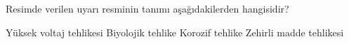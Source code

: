 \begin{question}[subtitle=]
  	\begin{figure}[!htb]
		\centering
		\fbox{\texttt{[image: ww23]}}
	\end{figure}

  Resimde verilen uyarı resminin tanımı aşağıdakilerden hangisidir?
	\begin{tasks}
          \task Yüksek voltaj tehlikesi \correct
          \task Biyolojik tehlike
          \task Korozif tehlike 
          \task Zehirli madde tehlikesi
	\end{tasks}
\end{question}
\begin{solution}
	\correct
\end{solution}


